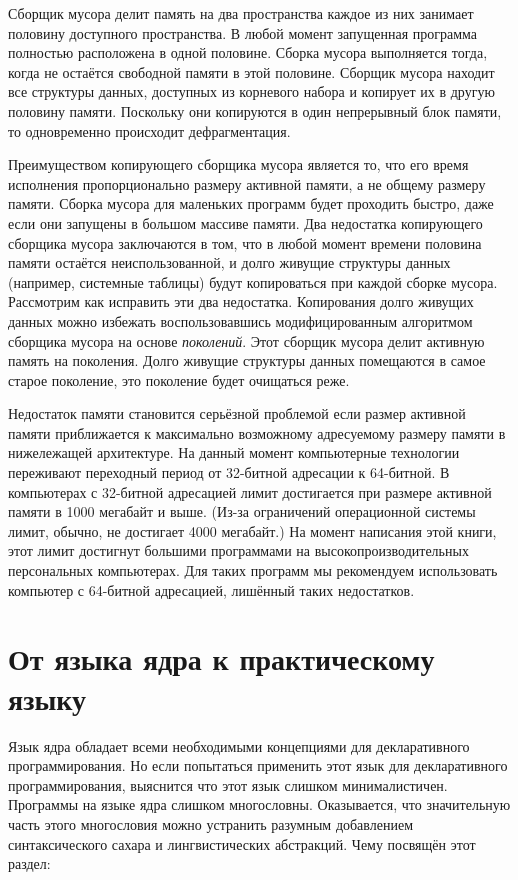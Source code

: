 Сборщик мусора делит память на два пространства каждое из них занимает половину доступного пространства. В любой момент запущенная программа полностью расположена в одной половине. Сборка мусора выполняется тогда, когда не остаётся свободной памяти в этой половине. Сборщик мусора находит все структуры данных, доступных из корневого набора и копирует их в другую половину памяти. Поскольку они копируются в один непрерывный блок памяти, то одновременно происходит дефрагментация.

Преимуществом копирующего сборщика мусора является то, что его время исполнения пропорционально размеру активной памяти, а не общему размеру памяти. Сборка мусора для маленьких программ будет проходить быстро, даже если они запущены в большом массиве памяти. Два недостатка копирующего сборщика мусора заключаются в том, что в любой момент времени половина памяти остаётся неиспользованной, и долго живущие структуры данных (например, системные таблицы) будут копироваться при каждой сборке мусора. Рассмотрим как исправить эти два недостатка. Копирования долго живущих данных можно избежать воспользовавшись модифицированным алгоритмом сборщика мусора на основе \emph{поколений}. Этот сборщик мусора делит активную память на поколения. Долго живущие структуры данных помещаются в самое старое поколение, это поколение будет очищаться реже.

Недостаток памяти становится серьёзной проблемой если размер активной памяти приближается к максимально возможному адресуемому размеру памяти в нижележащей архитектуре. На данный момент компьютерные технологии переживают переходный период от 32-битной адресации к 64-битной. В компьютерах с 32-битной адресацией лимит достигается при размере активной памяти в 1000 мегабайт и выше. (Из-за ограничений операционной системы лимит, обычно, не достигает 4000 мегабайт.) На момент написания этой книги, этот лимит достигнут большими программами на высокопроизводительных персональных компьютерах. Для таких программ мы рекомендуем использовать компьютер с 64-битной адресацией, лишённый таких недостатков.

\section{От языка ядра к практическому языку}\label{section:from_kernel_language_to_practical_language}

Язык ядра обладает всеми необходимыми концепциями для декларативного программирования. Но если попытаться применить этот язык для декларативного программирования, выяснится что этот язык слишком минималистичен. Программы на языке ядра слишком многословны. Оказывается, что значительную часть этого многословия можно устранить разумным добавлением синтаксического сахара и лингвистических абстракций. Чему посвящён этот раздел:

